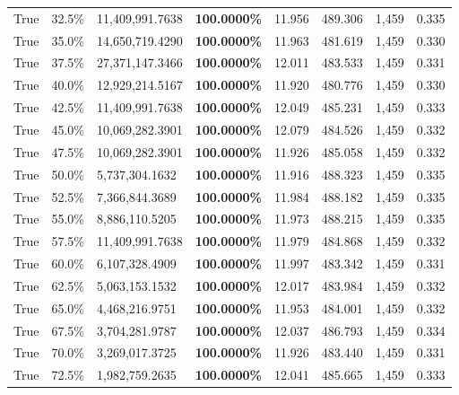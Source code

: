 \begin{table}[H]
\begin{tabular}{lllrllll}
\cline{1-8}
True & 32.5\% & 11,409,991.7638 & \bfseries \color{red} 100.0000\% & 11.956 & 489.306 & 1,459 & 0.335 \\
\cline{1-8}
True & 35.0\% & 14,650,719.4290 & \bfseries \color{red} 100.0000\% & 11.963 & 481.619 & 1,459 & 0.330 \\
\cline{1-8}
True & 37.5\% & 27,371,147.3466 & \bfseries \color{red} 100.0000\% & 12.011 & 483.533 & 1,459 & 0.331 \\
\cline{1-8}
True & 40.0\% & 12,929,214.5167 & \bfseries \color{red} 100.0000\% & 11.920 & 480.776 & 1,459 & 0.330 \\
\cline{1-8}
True & 42.5\% & 11,409,991.7638 & \bfseries \color{red} 100.0000\% & 12.049 & 485.231 & 1,459 & 0.333 \\
\cline{1-8}
True & 45.0\% & 10,069,282.3901 & \bfseries \color{red} 100.0000\% & 12.079 & 484.526 & 1,459 & 0.332 \\
\cline{1-8}
True & 47.5\% & 10,069,282.3901 & \bfseries \color{red} 100.0000\% & 11.926 & 485.058 & 1,459 & 0.332 \\
\cline{1-8}
True & 50.0\% & 5,737,304.1632 & \bfseries \color{red} 100.0000\% & 11.916 & 488.323 & 1,459 & 0.335 \\
\cline{1-8}
True & 52.5\% & 7,366,844.3689 & \bfseries \color{red} 100.0000\% & 11.984 & 488.182 & 1,459 & 0.335 \\
\cline{1-8}
True & 55.0\% & 8,886,110.5205 & \bfseries \color{red} 100.0000\% & 11.973 & 488.215 & 1,459 & 0.335 \\
\cline{1-8}
True & 57.5\% & 11,409,991.7638 & \bfseries \color{red} 100.0000\% & 11.979 & 484.868 & 1,459 & 0.332 \\
\cline{1-8}
True & 60.0\% & 6,107,328.4909 & \bfseries \color{red} 100.0000\% & 11.997 & 483.342 & 1,459 & 0.331 \\
\cline{1-8}
True & 62.5\% & 5,063,153.1532 & \bfseries \color{red} 100.0000\% & 12.017 & 483.984 & 1,459 & 0.332 \\
\cline{1-8}
True & 65.0\% & 4,468,216.9751 & \bfseries \color{red} 100.0000\% & 11.953 & 484.001 & 1,459 & 0.332 \\
\cline{1-8}
True & 67.5\% & 3,704,281.9787 & \bfseries \color{red} 100.0000\% & 12.037 & 486.793 & 1,459 & 0.334 \\
\cline{1-8}
True & 70.0\% & 3,269,017.3725 & \bfseries \color{red} 100.0000\% & 11.926 & 483.440 & 1,459 & 0.331 \\
\cline{1-8}
True & 72.5\% & 1,982,759.2635 & \bfseries \color{red} 100.0000\% & 12.041 & 485.665 & 1,459 & 0.333 \\

\end{tabular}
\end{table}

